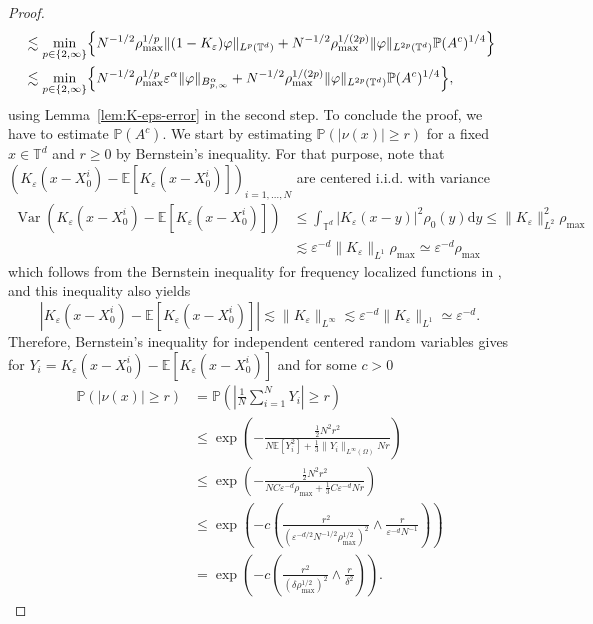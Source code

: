 \documentclass[a4paper,12pt]{article}
\newcommand{\mathd}{\mathrm{d}}
\newcommand{\E}{\mathbb{E}}
\begin{document}
\begin{proof}
\begin{align}
            & \lesssim \min_{p \in \{2,\infty\}} \Bigl\{ N^{-1/2}\rho_{\max}^{1/p} \|(1-K_\varepsilon)\varphi\|_{L^p(\mathbb T^d)} + N^{-1/2}\rho_{\max}^{1/(2p)}\|\varphi\|_{L^{2p}(\mathbb T^d)}\mathbb P(A^c)^{1/4}\Bigr\} \\
        & \lesssim \min_{p \in \{2,\infty\}} \Bigl\{ N^{-1/2} \rho_{\max}^{1/p} \varepsilon^\alpha\|\varphi\|_{B^\alpha_{p,\infty}} + N^{-1/2} \rho_{\max}^{1/(2p)}\|\varphi\|_{L^{2p}(\mathbb T^d)} \mathbb P(A^c)^{1/4} \Bigr\}, \label{eq:initial-pr2}
\end{align}
using Lemma~\ref{lem:K-eps-error} in the second step. To conclude the proof, we have to estimate $\mathbb P(A^c)$. We start by estimating $\mathbb P(|\nu(x)| \ge r)$ for a fixed $x \in \mathbb T^d$ and $r \ge 0$ by Bernstein's inequality. For that purpose, note that $(K_\varepsilon(x-X^i_0) - \mathbb E[K_\varepsilon(x-X^i_0)])_{i=1,\dots,N}$ are centered i.i.d. with variance
\begin{align*}
    \operatorname{Var}(K_\varepsilon(x-X^i_0) - \mathbb E[K_\varepsilon(x-X^i_0)]) & \leq \int_{\mathbb T^d} |K_\varepsilon(x-y)|^2 \rho_0(y)\mathd y \leq \|K_\varepsilon\|_{L^2}^2 \rho_{\max} \\
    & \lesssim \varepsilon^{-d} \|K_\varepsilon\|_{L^1} \rho_{\max} \simeq \varepsilon^{-d} \rho_{\max}
\end{align*}
which follows from the Bernstein inequality for frequency localized functions in \cite[Lemma 2.1]{Bahouri2011}, and this inequality also yields
\[
    |K_\varepsilon(x-X^i_0) - \mathbb E[K_\varepsilon(x-X^i_0)]| \lesssim \|K_\varepsilon\|_{L^\infty} \lesssim \varepsilon^{-d} \|K_\varepsilon\|_{L^1} \simeq \varepsilon^{-d}.
\]
Therefore, Bernstein's inequality for independent centered random variables gives for $Y_i = K_\varepsilon(x-X^i_0) - \mathbb E[K_\varepsilon(x-X^i_0)]$ and for some $c>0$
\begin{align*}
    \mathbb P(|\nu(x)| \ge r) & = \mathbb P\left(\left|\frac1N \sum_{i=1}^N Y_i\right| \ge r\right) \\
    & \leq \exp\left( -\frac{\tfrac12 N^2 r^2}{N\E[Y_i^2] + \tfrac13 \|Y_i\|_{L^\infty(\Omega)} Nr} \right)\\
    & \leq \exp\left( -\frac{\tfrac12 N^2 r^2}{NC\varepsilon^{-d} \rho_{\max} + \tfrac13 C\varepsilon^{-d}Nr} \right) \\
    & \leq \exp\left( -c \left(\frac{r^2}{(\varepsilon^{-d/2} N^{-1/2}\rho_{\max}^{1/2})^2}\wedge \frac{r}{\varepsilon^{-d}N^{-1}} \right)\right)\\
    & = \exp\left( -c \left(\frac{r^2}{(\delta\rho_{\max}^{1/2})^2}\wedge \frac{r}{\delta^2} \right)\right).

\end{align*}
\end{proof}
\end{document}
